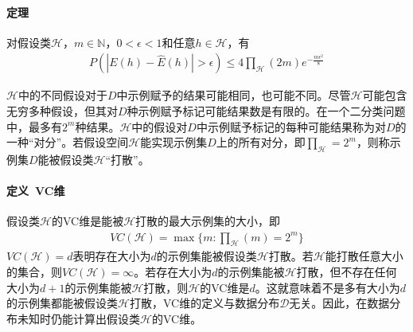 \paragraph{定理}对假设类$\mathcal{H}$，$m\in\mathbb{N}$，$0<\epsilon<1$和任意$h\in\mathcal{H}$，有
\begin{eqnarray}
P(|E(h)-\hat{E}(h)|>\epsilon)\leq 4\prod_\mathcal{H}(2m)e^{-\frac{m\epsilon^2}{8}}
\end{eqnarray}

$\mathcal{H}$中的不同假设对于$D$中示例赋予的结果可能相同，也可能不同。尽管$\mathcal{H}$可能包含无穷多种假设，但其对$D$种示例赋予标记可能结果数是有限的。在一个二分类问题中，最多有$2^m$种结果。$\mathcal{H}$中的假设对$D$中示例赋予标记的每种可能结果称为对$D$的一种“对分”。若假设空间$\mathcal{H}$能实现示例集$D$上的所有对分，即$\prod_\mathcal{H}=2^m$，则称示例集$D$能被假设类$\mathcal{H}$“打散”。

\paragraph{定义\ VC维}假设类$\mathcal{H}$的VC维是能被$\mathcal{H}$打散的最大示例集的大小，即
\begin{eqnarray}
VC(\mathcal{H})=\max\{ m:\prod_\mathcal{H}(m)=2^m \}
\end{eqnarray}
$VC(\mathcal{H})=d$表明存在大小为$d$的示例集能被假设类$\mathcal{H}$打散。若$\mathcal{H}$能打散任意大小的集合，则$VC(\mathcal{H})=\infty$。若存在大小为$d$的示例集能被$\mathcal{H}$打散，但不存在任何大小为$d+1$的示例集能被$\mathcal{H}$打散，则$\mathcal{H}$的VC维是$d$。这就意味着不是多有大小为$d$的示例集都能被假设类$\mathcal{H}$打散，VC维的定义与数据分布$\mathcal{D}$无关。因此，在数据分布未知时仍能计算出假设类$\mathcal{H}$的VC维。

